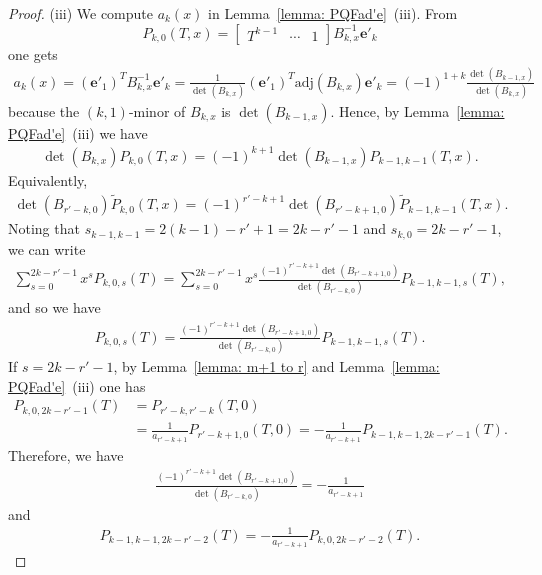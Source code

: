 \documentclass[11pt]{amsart}
\theoremstyle{definition}
\numberwithin{equation}{subsection}
\theoremstyle{plain}
\theoremstyle{plain}
\theoremstyle{plain}
\theoremstyle{plain}
\theoremstyle{plain}
\theoremstyle{plain}
\theoremstyle{plain}
\theoremstyle{plain}
\theoremstyle{plain}
\theoremstyle{plain}
\theoremstyle{plain}
\theoremstyle{plain}
\theoremstyle{definition}
\theoremstyle{definition}
\theoremstyle{definition}
\theoremstyle{remark}
\renewcommand{\(}{\textup{(}}
\renewcommand{\)}{\textup{)}}
\newcommand{\adj}{\mathrm{adj}}
\begin{document}
\begin{proof}
(iii) We compute $a_k(x)$ in Lemma~\ref{lemma: PQFad'e}~(iii). From
        $$P_{k,0}(T,x)=
        \begin{bmatrix}
            T^{k-1} & \cdots & 1
        \end{bmatrix}
        B_{k,x}^{-1}\mathbf{e}'_{k}$$
one gets
    \begin{align*}
        a_k(x)
        =(\mathbf{e}'_1)^T B_{k,x}^{-1}\mathbf{e}'_{k}
        =\frac{1}{\det(B_{k,x})}(\mathbf{e}'_1)^T \adj(B_{k,x}) \mathbf{e}'_{k}
        =(-1)^{1+k}\frac{\det(B_{k-1,x})}{\det(B_{k,x})}
    \end{align*}
because the $(k,1)$-minor of $B_{k,x}$ is $\det(B_{k-1,x})$. Hence, by Lemma~\ref{lemma: PQFad'e}~(iii) we have
    \begin{align*}
        \det(B_{k,x})P_{k,0}(T,x)=(-1)^{k+1}\det(B_{k-1,x})P_{k-1,k-1}(T,x).
    \end{align*}
Equivalently,
    \begin{align*}
        \det(B_{r'-k,0})\tilde P_{k,0}(T,x)
        =(-1)^{r'-k+1}\det(B_{r'-k+1,0})\tilde P_{k-1,k-1}(T,x).
    \end{align*}
Noting that $s_{k-1,k-1}=2(k-1)-r'+1=2k-r'-1$ and $s_{k,0}=2k-r'-1$, we can write
    \begin{align*}
        \sum_{s=0}^{2k-r'-1}x^sP_{k,0,s}(T)
        =\sum_{s=0}^{2k-r'-1}x^s
        \frac{(-1)^{r'-k+1}\det(B_{r'-k+1,0})}{\det(B_{r'-k,0})}P_{k-1,k-1,s}(T),
    \end{align*}
and so we have
    \begin{align}\label{eq: P_k,0,s and P_k-1,k-1,s}
        P_{k,0,s}(T)=\frac{(-1)^{r'-k+1}\det(B_{r'-k+1,0})}{\det(B_{r'-k,0})}P_{k-1,k-1,s}(T).
    \end{align}
If $s=2k-r'-1$, by Lemma~\ref{lemma: m+1 to r} and Lemma~\ref{lemma: PQFad'e}~(iii) one has
    \begin{align*}
        P_{k,0,2k-r'-1}(T)
        &=P_{r'-k,r'-k}(T,0)\\
        &=\frac{1}{a_{r'-k+1}}P_{r'-k+1,0}(T,0)
        =-\frac{1}{a_{r'-k+1}}P_{k-1,k-1,2k-r'-1}(T).
    \end{align*}
Therefore, we have
    \begin{align}\label{eq: a_r-k+1}
        \frac{(-1)^{r'-k+1}\det(B_{r'-k+1,0})}{\det(B_{r'-k,0})}=-\frac{1}{a_{r'-k+1}}
    \end{align}
    and
    \begin{align*}
        P_{k-1,k-1,2k-r'-2}(T)
        =-\frac{1}{a_{r'-k+1}}P_{k,0,2k-r'-2}(T).
    \end{align*}


\end{proof}
\end{document}
